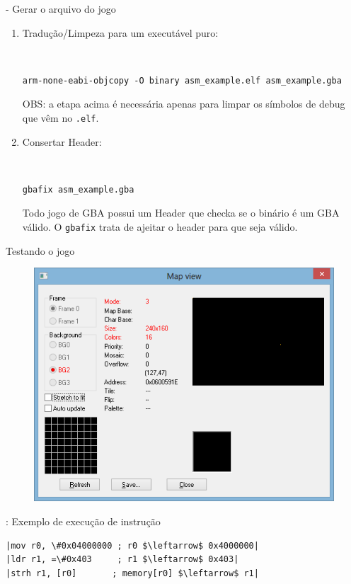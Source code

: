 \documentclass{beamer}
\begin{document}
\begin{darkframes}
\begin{frame}[fragile]{\subsecname - Gerar o arquivo do jogo}
\begin{enumerate}
        \vspace{1em}
        \item Tradução/Limpeza para um executável puro:
        {\
            \tiny
            \begin{verbatim}
arm-none-eabi-objcopy -O binary asm_example.elf asm_example.gba
            \end{verbatim}

            OBS: a etapa acima é necessária apenas para limpar os símbolos
            de debug que vêm no \texttt{.elf}.
        }

        \vspace{1em}
        \item Consertar Header:
        {\
            \tiny
            \begin{verbatim}
gbafix asm_example.gba
            \end{verbatim}

            Todo jogo de GBA possui um Header que checka se o binário é um GBA
            válido. O \texttt{gbafix} trata de ajeitar o header para que seja
            válido.
        }
    \end{enumerate}
\end{frame}

\begin{frame}{Testando o jogo}
    \begin{figure}[H]
        \centering
        \includegraphics[width=1\textwidth,height=0.5\textheight,keepaspectratio]{mapview_asm_example}
    \end{figure}
\end{frame}
\begin{frame}[fragile]{\secname: Exemplo de execução de instrução}
    \vspace{-2em}
    \begin{verbatim}
|mov r0, \#0x04000000 ; r0 $\leftarrow$ 0x4000000|
|ldr r1, =\#0x403     ; r1 $\leftarrow$ 0x403|
|strh r1, [r0]       ; memory[r0] $\leftarrow$ r1|
    \end{verbatim}


\end{frame}
\end{darkframes}
\end{document}
